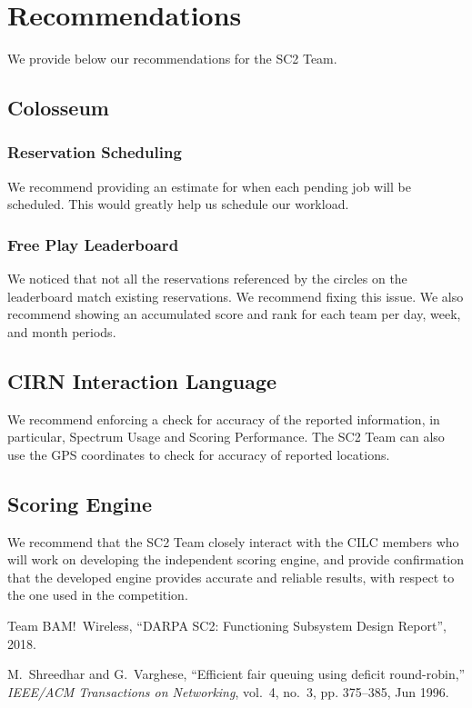 \documentclass[11pt]{article}
\begin{document}
\section{Recommendations}
We provide below our recommendations for the SC2 Team.
\subsection{Colosseum}
\subsubsection{Reservation Scheduling}
We recommend providing an estimate for when each pending job will be scheduled. This would greatly help us schedule our workload.
\subsubsection{Free Play Leaderboard}
We noticed that not all the reservations referenced by the circles on the leaderboard match existing reservations. We recommend fixing this issue. We also recommend showing an accumulated score and rank for each team per day, week, and month periods.
\subsection{CIRN Interaction Language}
We recommend enforcing a check for accuracy of the reported information, in particular, Spectrum Usage and Scoring Performance. The SC2 Team can also use the GPS coordinates to check for accuracy of reported locations.
\subsection{Scoring Engine}
We recommend that the SC2 Team closely interact with the CILC members who will work on developing the independent scoring engine, and provide confirmation that the developed engine provides accurate and reliable results, with respect to the one used in the competition.
\begin{thebibliography}{2}
 Team BAM!\ Wireless, ``DARPA SC2: Functioning Subsystem Design Report'', 2018.
 
 
 
 
M.~Shreedhar and G.~Varghese, ``Efficient fair queuing using deficit
  round-robin,'' \emph{IEEE/ACM Transactions on Networking}, vol.~4, no.~3, pp.
  375--385, Jun 1996.

 
 \end{thebibliography}
\end{document}
